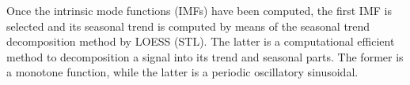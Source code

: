 \documentclass[../Main/thesis.tex]{subfiles}
\begin{document}
	\justify
	Once the intrinsic mode functions (IMFs) have been computed, the first IMF is selected and its seasonal trend is computed by means of the seasonal trend decomposition method by LOESS (STL). The latter is a computational efficient method to decomposition a signal into its trend and seasonal parts. The former is a monotone function, while the latter is a periodic oscillatory sinusoidal.
	\justify
\end{document}
